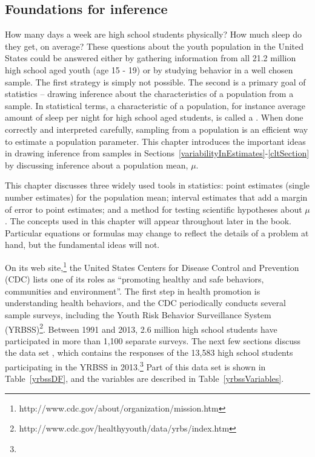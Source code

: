 
\begin{spacing}{1.5}

\chapter{Foundations for inference}
\label{foundationsForInference}

How many days a week are high school students physically?    How much sleep do they get, on average?  These questions about the youth population in the United States could be answered either by gathering information from all 21.2 million high school aged youth (age 15 - 19) or by studying behavior in a well chosen sample. The first strategy is simply not possible.  The second is a primary goal of statistics -- drawing inference about the characteristics of a population from a sample.  In statistical terms, a characteristic of a population, for instance average amount of sleep per night for high school aged students, is called a .  When done correctly and interpreted carefully, sampling from a population is an efficient way to estimate a population parameter.  This chapter introduces the important ideas in drawing inference from samples in Sections~\ref{variabilityInEstimates}-\ref{cltSection} by discussing inference about a population mean, $\mu$.  

This chapter discusses three widely used tools in statistics: point estimates (single number estimates) for the population mean; interval estimates that add a margin of error to point estimates; and a method for testing scientific hypotheses about $\mu$. The concepts used in this chapter will appear throughout later in the book.  Particular equations or formulas may change to reflect the details of a problem at hand, but the fundamental ideas will not.  


On its web site,\footnote{http://www.cdc.gov/about/organization/mission.htm } the United States Centers for Disease Control and Prevention (CDC) lists one of its roles as ``promoting healthy and safe behaviors, communities and environment''.  The first step in health promotion is understanding health behaviors, and the CDC periodically conducts several sample surveys, including the Youth Risk Behavior Surveillance System (YRBSS)\footnote{http://www.cdc.gov/healthyyouth/data/yrbs/index.htm}.  Between 1991 and 2013, 2.6 million high school students have participated in more than 1,100 separate surveys. The next few sections discuss the data set , which contains the responses of the 13,583 high school students participating in the YRBSS in 2013.\footnote{} Part of this data set is shown in Table~\ref{yrbssDF}, and the variables are described in Table~\ref{yrbssVariables}.



\end{spacing}
